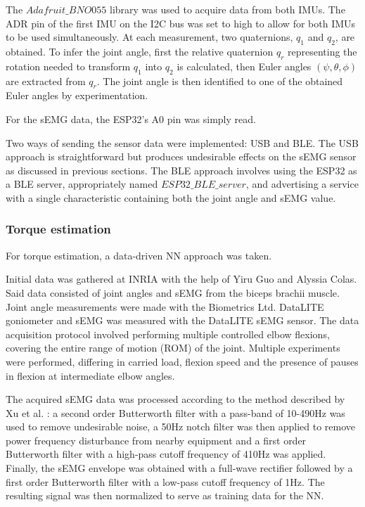 The $Adafruit\_BNO055$ library was used to acquire data from both IMUs. The ADR 
pin of the first IMU on the I2C bus was set to high to allow for both IMUs to 
be used simultaneously. At each measurement, two quaternions, $q_1$ and $q_2$, 
are obtained. To infer the joint angle, first the relative quaternion $q_r$ 
representing the rotation needed to transform $q_1$ into $q_2$ is calculated, 
then Euler angles $(\psi, \theta, \phi)$ are extracted from $q_r$. The joint 
angle is then identified to one of the obtained Euler angles by experimentation.  

For the sEMG data, the ESP32's A0 pin was simply read.  

Two ways of sending the sensor data were implemented: USB and BLE. The USB 
approach is straightforward but produces undesirable effects on the sEMG sensor 
as discussed in previous sections. The BLE approach involves using the ESP32 
as a BLE server, appropriately named $ESP32\_BLE\_server$, and advertising a 
service with a single characteristic containing both the joint angle and sEMG 
value. 
\FloatBarrier

\subsubsection{Torque estimation}
For torque estimation, a data-driven NN approach was taken.  

Initial data was gathered at INRIA with the help of Yiru Guo and Alyssia Colas. 
Said data consisted of joint angles and sEMG from the biceps brachii muscle. 
Joint angle measurements were made with the Biometrics Ltd. DataLITE goniometer 
and sEMG was measured with the DataLITE sEMG sensor. The data acquisition protocol 
involved performing multiple controlled elbow flexions, covering the entire range 
of motion (ROM) of the joint. Multiple experiments were performed, differing in 
carried load, flexion speed and the presence of pauses in flexion at intermediate 
elbow angles.  

The acquired sEMG data was processed according to the method described by Xu et al. 
\cite{wu_adaptive_2023}: a second order Butterworth filter with a pass-band of 
10-490Hz was used to remove undesirable noise, a 50Hz notch filter was then applied 
to remove power frequency disturbance from nearby equipment and a first order 
Butterworth filter with a high-pass cutoff frequency of 410Hz was applied. Finally, 
the sEMG envelope was obtained with a full-wave rectifier followed by a first order 
Butterworth filter with a low-pass cutoff frequency of 1Hz. The resulting signal 
was then normalized to serve as training data for the NN.  


